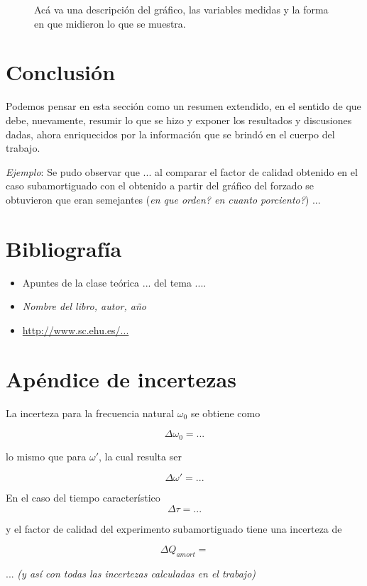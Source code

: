 \documentclass[12pt,a4paper]{article}
\begin{document}
\begin{figure}[ht]
    \centering
    \caption{Acá va una descripción del gráfico, las variables medidas y la forma en que midieron lo que se muestra. }
    \label{fig2}
\end{figure}


\section{Conclusión}

Podemos pensar en esta sección como un resumen extendido, en el sentido de que debe, nuevamente, resumir lo que se hizo y exponer los resultados y discusiones dadas, ahora enriquecidos por la información que se brindó en el cuerpo del trabajo.

\textit{Ejemplo}: Se pudo observar que ... al comparar el factor de calidad obtenido en el caso subamortiguado con el obtenido
a partir del gráfico del forzado se obtuvieron que eran semejantes (\textit{en que orden? en cuanto porciento?}) ...


\section{Bibliografía}
\begin{itemize}
    \item Apuntes de la clase teórica ... del tema ....
    \item \textit{Nombre del libro, autor, año}
    \item \hyperlink{http://www.sc.ehu.es/...}{http://www.sc.ehu.es/...}
\end{itemize}

\section{Apéndice de incertezas}

La incerteza para la frecuencia natural $\omega_0$ se obtiene como

\begin{equation}
    \Delta\omega_0= ...
\end{equation}
 
lo mismo que para $\omega'$, la cual resulta ser

\begin{equation}
    \Delta\omega'= ...
\end{equation}

En el caso del tiempo característico
\begin{equation}
    \Delta \tau = ...
\end{equation}

y el factor de calidad del experimento subamortiguado tiene una incerteza de

\begin{equation}
    \Delta Q_{amort} = 
\end{equation}

... \textit{(y así con todas las incertezas calculadas en el trabajo)}
\end{document}
